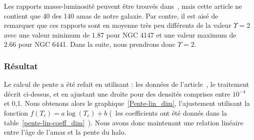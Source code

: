 				Les rapports masse-luminosité peuvent être trouvés dans~\cite{McL}, mais cette article ne contient que 40 des 140 amas de notre galaxie.
				Par contre, il est aisé de remarquer que ces rapports sont
				en moyenne très peu différents de la valeur $\Upsilon = 2$ avec une valeur minimum de $1.87$ pour NGC 4147 et une valeur maximum de
				$2.66$ pour NGC 6441. Dans la suite, nous prendrons donc $\Upsilon = 2$.


			\subsubsection{Résultat}
				Le calcul de pente a été refait en utilisant : les données de l'article~\cite{TragerTable}, le traitement décrit ci-dessus, et en ajustant une
				droite pour des densités comprises entre $10^{-4}$ et 0,1.
				Nous obtenons alors le graphique~\ref{Pente-lin_dim}, l'ajustement utilisant la fonction
				$f(T_c) = a \log(T_c) + b$ (~les coefficients ont été donnés dans la table~\ref{pente-lin-coeff_dim}~).
				Nous avons donc maintenant une relation linéaire entre l'âge de l'amas et la pente du halo.

